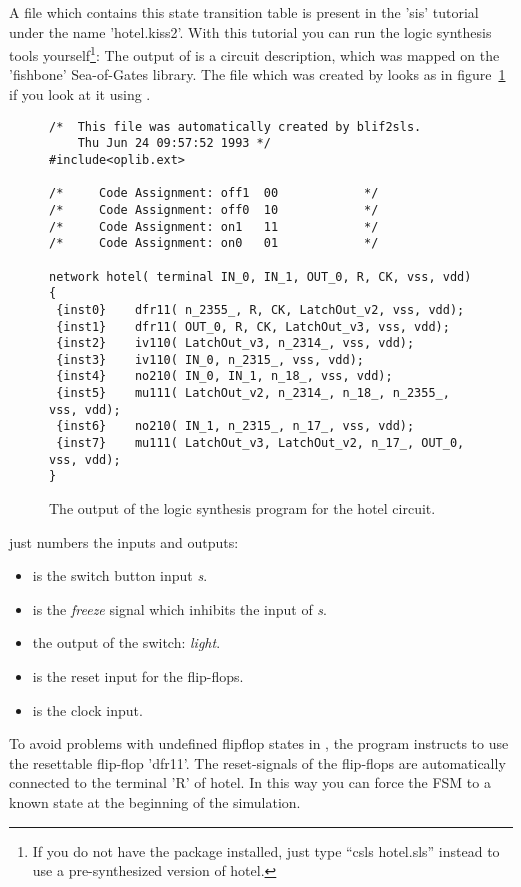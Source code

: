 A file which contains this state transition table is present in the 'sis'
tutorial under the name 'hotel.kiss2'. With this tutorial you can run the logic
synthesis tools yourself\footnote{If you do not have the  package
installed, just type ``csls hotel.sls'' instead to use a pre-synthesized
version of hotel.}:
 The output of
 is a circuit description, which was mapped on the 'fishbone'
Sea-of-Gates library.  The file
 which was created by  looks as in
figure~\ref{hotelsis} if you look at it using .
\begin{figure}
{\small
\begin{verbatim}
/*  This file was automatically created by blif2sls.
    Thu Jun 24 09:57:52 1993 */
#include<oplib.ext>

/*     Code Assignment: off1  00            */
/*     Code Assignment: off0  10            */
/*     Code Assignment: on1   11            */
/*     Code Assignment: on0   01            */

network hotel( terminal IN_0, IN_1, OUT_0, R, CK, vss, vdd)
{
 {inst0}    dfr11( n_2355_, R, CK, LatchOut_v2, vss, vdd);
 {inst1}    dfr11( OUT_0, R, CK, LatchOut_v3, vss, vdd);
 {inst2}    iv110( LatchOut_v3, n_2314_, vss, vdd);
 {inst3}    iv110( IN_0, n_2315_, vss, vdd);
 {inst4}    no210( IN_0, IN_1, n_18_, vss, vdd);
 {inst5}    mu111( LatchOut_v2, n_2314_, n_18_, n_2355_, vss, vdd);
 {inst6}    no210( IN_1, n_2315_, n_17_, vss, vdd);
 {inst7}    mu111( LatchOut_v3, LatchOut_v2, n_17_, OUT_0, vss, vdd);
}
\end{verbatim}
}
\caption{The output of the logic synthesis program
\protect{} for the hotel circuit.} 
\label{hotelsis}
\end{figure}
 just numbers the inputs and outputs:
\begin{itemize}
\item[IN\_0]
is the switch button input {\sl s}.
\item[IN\_1]
is the {\sl freeze} signal which inhibits the input of {\sl s}.
\item[OUT\_0]
the output of the switch: {\sl light}.
\item[R]
is the reset input for the flip-flops.
\item[CK]
is the clock input.
\end{itemize}

To avoid problems with undefined flipflop states in , the program
 instructs  to use the resettable flip-flop 'dfr11'. The
reset-signals of the flip-flops are automatically connected to the terminal 'R'
of hotel. In this way you can force the FSM to a known state at the beginning
of the simulation.

